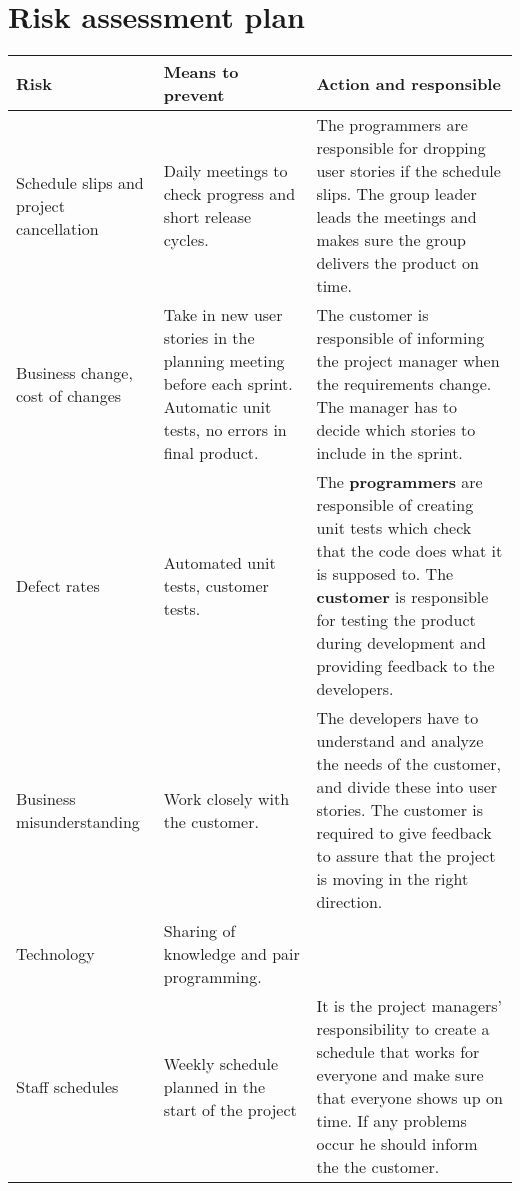 \newpage
\section{Risk assessment plan}
\label{app:Risk assessment}
\begin{adjustbox}{center}
\begin{tabular}{ p{0.1\paperwidth} | p{0.25\paperwidth} | p{0.3\paperwidth} }
    Risk & Means to prevent & Action and responsible \\ \hline
    Schedule slips and project cancellation
    & Daily meetings to check progress and short release cycles.
    & The programmers are responsible for dropping user stories if the schedule slips. The group leader leads the meetings and makes sure the group delivers the product on time. \\ \hline
    
    Business change, cost of changes
    & Take in new user stories in the planning meeting before each sprint. Automatic unit tests, no errors in final product.
    & The customer is responsible of informing the project manager when the requirements change. The manager has to decide which stories to include in the sprint. \\ \hline
    
    Defect rates
    & Automated unit tests, customer tests.
    & The \textbf{programmers} are responsible of creating unit tests which check that the code does what it is supposed to. The \textbf{customer} is responsible for testing the product during development and providing feedback to the developers. \\ \hline
    
    Business misunderstanding
    & Work closely with the customer.
    & The developers have to understand and analyze the needs of the customer, and divide these into user stories. The customer is required to give feedback to assure that the project is moving in the right direction. \\ \hline
    
    Technology
    & Sharing of knowledge and pair programming. 
    & \\ \hline
    
    Staff schedules
    & Weekly schedule planned in the start of the project
    & It is the project managers' responsibility to create a schedule that works for everyone and make sure that everyone shows up on time. If any problems occur he should inform the the customer. \\ \hline
    
\end{tabular}
\end{adjustbox}